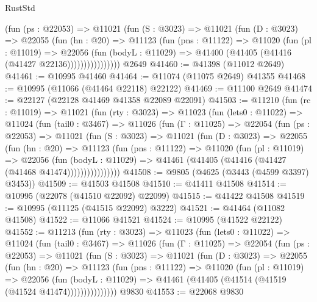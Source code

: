 \begin{lexlean}{RustStd}
\begin{coremodule}
                (fun (ps : @22053) =>
                @11021
                  (fun (S : @3023) =>
                  @11021
                    (fun (D : @3023) =>
                    @22055
                      (fun (hn : @20) =>
                      @11123
                        (fun (pns : @11122) =>
                        @11020
                          (fun (pl : @11019) =>
                          @22056
                            (fun (bodyL : @11029) =>
                            @41400 (@41405 (@41416 (@41427 @22136))))))))))))))))
    @2649
@41460 := @41398 (@11012 @2649)
@41461 := @10995 @41460
@41464 := @11074 (@11075 @2649) @41355
@41468 := @10995 (@11066 (@41464 @22118) @22122)
@41469 := @11100 @2649
@41474 := @22127 (@22128 @41469 @41358 @22089 @22091)
@41503 := @11210
    (fun (rc : @11019) =>
    @11021
      (fun (rty : @3023) =>
      @11023
        (fun (lets0 : @11022) =>
        @11024
          (fun (tail0 : @3467) =>
          @11026
            (fun (Γ : @11025) =>
            @22054
              (fun (ps : @22053) =>
              @11021
                (fun (S : @3023) =>
                @11021
                  (fun (D : @3023) =>
                  @22055
                    (fun (hn : @20) =>
                    @11123
                      (fun (pns : @11122) =>
                      @11020
                        (fun (pl : @11019) =>
                        @22056
                          (fun (bodyL : @11029) =>
                          @41461 (@41405 (@41416 (@41427 (@41468 @41474))))))))))))))))
@41508 := @9805 (@4625 (@3443 (@4599 @3397) @3453))
@41509 := @41503 @41508
@41510 := @41411 @41508
@41514 := @10995 (@22078 (@41510 @22092) @22099)
@41515 := @41422 @41508
@41519 := @10995 (@11125 (@41515 @22092) @3222)
@41521 := @41464 (@11082 @41508)
@41522 := @11066 @41521
@41524 := @10995 (@41522 @22122)
@41552 := @11213
    (fun (rty : @3023) =>
    @11023
      (fun (lets0 : @11022) =>
      @11024
        (fun (tail0 : @3467) =>
        @11026
          (fun (Γ : @11025) =>
          @22054
            (fun (ps : @22053) =>
            @11021
              (fun (S : @3023) =>
              @11021
                (fun (D : @3023) =>
                @22055
                  (fun (hn : @20) =>
                  @11123
                    (fun (pns : @11122) =>
                    @11020
                      (fun (pl : @11019) =>
                      @22056
                        (fun (bodyL : @11029) =>
                        @41461 (@41405 (@41514 (@41519 (@41524 @41474)))))))))))))))
    @9830
@41553 := @22068 @9830

\end{coremodule}
\end{lexlean}
